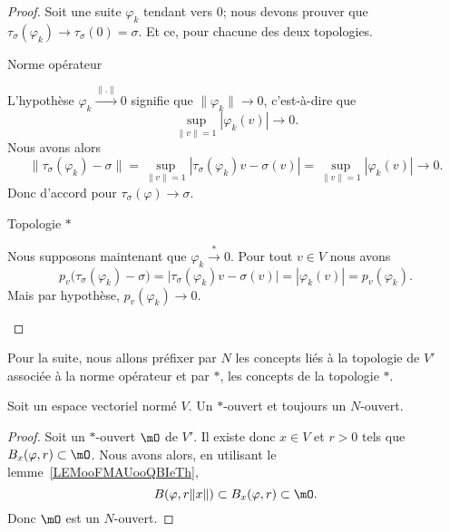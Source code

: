 \begin{proof}
    Soit une suite \( \varphi_k\) tendant vers \( 0\); nous devons prouver que \( \tau_{\sigma}(\varphi_k)\to \tau_{\sigma}(0)=\sigma\). Et ce, pour chacune des deux topologies.

    \begin{subproof}
        \item[Norme opérateur]

            L'hypothèse \( \varphi_k\stackrel{\| . \|}{\longrightarrow} 0\) signifie que \( \| \varphi_k \|\to 0\), c'est-à-dire que
            \begin{equation}
                \sup_{\| v \|=1}| \varphi_k(v) |\to 0.
            \end{equation}
            Nous avons alors
            \begin{equation}
                \| \tau_{\sigma}(\varphi_k)-\sigma \|=\sup_{\| v \|=1}| \tau_{\sigma}(\varphi_k)v-\sigma(v) |=\sup_{\| v \|=1}| \varphi_k(v) |\to 0.
            \end{equation}
            Donc d'accord pour \( \tau_{\sigma}(\varphi)\to \sigma\).

        \item[Topologie $*$]

            Nous supposons maintenant que \( \varphi_k\stackrel{*}{\longrightarrow}0\). Pour tout \( v\in V\) nous avons
            \begin{equation}
                p_v\big( \tau_{\sigma}(\varphi_k)-\sigma \big)=\big| \tau_{\sigma}(\varphi_k)v-\sigma(v) \big|=| \varphi_k(v) |=p_v(\varphi_k).
            \end{equation}
            Mais par hypothèse, \( p_v(\varphi_k)\to 0\).
    \end{subproof}
\end{proof}

Pour la suite, nous allons préfixer par \( N\) les concepts liés à la topologie de \( V'\) associée à la norme opérateur et par \( *\), les concepts de la topologie \( *\).

\begin{proposition}     \label{PROPooFGXAooFRWweD}
    Soit un espace vectoriel normé \( V\). Un \( *\)-ouvert et toujours un \( N\)-ouvert.
\end{proposition}

\begin{proof}
    Soit un \( *\)-ouvert \( \mO\) de \( V'\). Il existe donc \( x\in V\) et \( r>0\) tels que \( B_x(\varphi,r)\subset \mO\). Nous avons alors, en utilisant le lemme~\ref{LEMooFMAUooQBIeTh},
    \begin{equation}
        B(\varphi,r\| x \|)\subset B_x(\varphi,r)\subset \mO.
    \end{equation}
    Donc \( \mO\) est un \( N\)-ouvert.
\end{proof}

